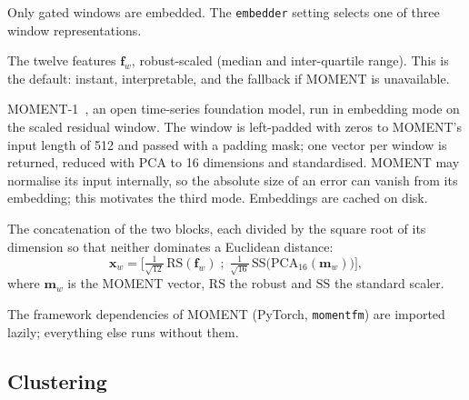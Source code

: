 \documentclass[10pt,twocolumn,a4paper]{article}
\begin{document}
Only gated windows are embedded. The \texttt{embedder} setting selects one of three window representations.
\begin{description}[leftmargin=0pt,labelindent=0pt,itemsep=2pt]
  \item[\texttt{features}] The twelve features $\mathbf f_w$, robust-scaled (median and inter-quartile range). This is the default: instant, interpretable, and the fallback if MOMENT is unavailable.
  \item[\texttt{moment}] MOMENT-1~\cite{goswami2024}, an open time-series foundation model, run in embedding mode on the scaled residual window. The window is left-padded with zeros to MOMENT's input length of 512 and passed with a padding mask; one vector per window is returned, reduced with PCA to 16 dimensions and standardised. MOMENT may normalise its input internally, so the absolute size of an error can vanish from its embedding; this motivates the third mode. Embeddings are cached on disk.
  \item[\texttt{both}] The concatenation of the two blocks, each divided by the square root of its dimension so that neither dominates a Euclidean distance:
  \begin{equation}
    \mathbf x_w=\Big[\tfrac{1}{\sqrt{12}}\,\mathrm{RS}(\mathbf f_w)\;;\;\tfrac{1}{\sqrt{16}}\,\mathrm{SS}\big(\mathrm{PCA}_{16}(\mathbf m_w)\big)\Big],
  \end{equation}
  where $\mathbf m_w$ is the MOMENT vector, $\mathrm{RS}$ the robust and $\mathrm{SS}$ the standard scaler.
\end{description}
The framework dependencies of MOMENT (PyTorch, \texttt{momentfm}) are imported lazily; everything else runs without them.

\subsection{Clustering}
\label{sec:cluster}
\end{document}

